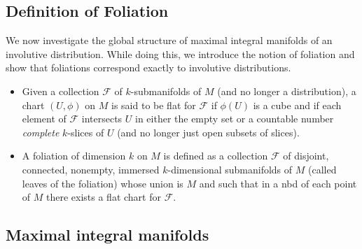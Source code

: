 \documentclass{report}
\theoremstyle{definition}
\begin{document}
\subsection{Definition of Foliation}

We now investigate the global structure of maximal integral manifolds of an involutive distribution. While doing this, we introduce the notion of foliation and show that foliations correspond exactly to involutive distributions.

\begin{itemize}
    \item Given a collection $\mathcal{F}$ of $k$-submanifolds of $M$ (and no longer a distribution), a chart $(U,\phi)$ on $M$ is said to be flat for $\mathcal{F}$ if $\phi(U)$ is a cube and if each element of $\mathcal{F}$ intersects $U$ in either the empty set or a countable number \emph{complete} $k$-slices of $U$ (and no longer just open subsets of slices).
    \item A foliation of dimension $k$ on $M$ is defined as a collection $\mathcal{F}$ of disjoint, connected, nonempty, immersed $k$-dimensional submanifolds of $M$ (called leaves of the foliation) whose union is $M$ and such that in a nbd of each point of $M$ there exists a flat chart for $\mathcal{F}$.
\end{itemize}

\subsection{Maximal integral manifolds}
\end{document}
